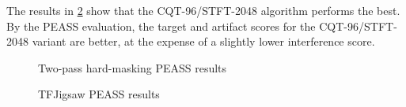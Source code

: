 \documentclass[10pt,letter]{article}
\begin{document}
The results in \ref{fig:round2hard} show that the CQT-96/STFT-2048 algorithm performs the best. By the PEASS evaluation, the target and artifact scores for the CQT-96/STFT-2048 variant are better, at the expense of a slightly lower interference score.

\begin{figure}
	\centering
	\vspace{-1.25em}
	\caption{Two-pass hard-masking PEASS results}
	\label{fig:round2hard}
\end{figure}

\begin{figure}
	\centering
	\vspace{-1.25em}
	\caption{TFJigsaw PEASS results}
	\label{fig:round2hard}
\end{figure}
\end{document}
